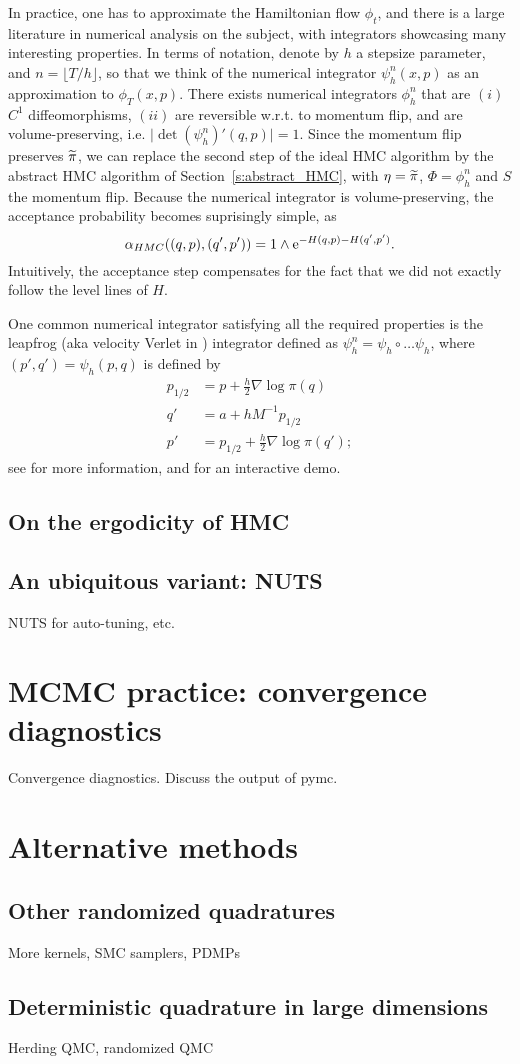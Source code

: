 In practice, one has to approximate the Hamiltonian flow $\phi_t$, and there is a large literature in numerical analysis on the subject, with integrators showcasing many interesting properties.
In terms of notation, denote by $h$ a stepsize parameter, and $n=\lfloor T/h\rfloor$, so that we think of the numerical integrator $\psi_h^n(x,p)$ as an approximation to $\phi_T(x,p)$.
There exists numerical integrators $\phi_h^n$ that are $(i)$ $C^1$ diffeomorphisms, $(ii)$ are reversible w.r.t. to momentum flip, and are volume-preserving, i.e. $\vert \det (\psi_h^n)'(q,p)\vert = 1$.
Since the momentum flip preserves $\widetilde{\pi}$, we can replace the second step of the ideal HMC algorithm by the abstract HMC algorithm of Section~\ref{s:abstract_HMC}, with $\eta=\widetilde{\pi}$, $\Phi=\phi_h^n$ and $S$ the momentum flip. 
Because the numerical integrator is volume-preserving, the acceptance probability becomes suprisingly simple, as 
$$ 
\alpha_{HMC}((q,p),(q',p')) = 1\wedge \mathrm{e}^{-H(q,p)-H(q',p')}.
$$
Intuitively, the acceptance step compensates for the fact that we did not exactly follow the level lines of $H$. 

One common numerical integrator satisfying all the required properties is the leapfrog (aka velocity Verlet in \citep{BoSa18}) integrator defined as $\psi_h^n = \psi_h \circ \dots \psi_h$, where $(p',q') = \psi_h(p,q)$ is defined by
\begin{align*}
    p_{1/2} &= p + \frac{h}{2}\nabla \log \pi(q)\\
    q' &= a+hM^{-1}p_{1/2}\\
    p' &= p_{1/2} + \frac{h}{2} \nabla \log\pi (q');
\end{align*}
see \citep[Section 3]{BoSa18} for more information, and \cfdemo for an interactive demo.

\subsection{On the ergodicity of HMC}

\subsection{An ubiquitous variant: NUTS}
NUTS for auto-tuning, etc.

\section{MCMC practice: convergence diagnostics}
Convergence diagnostics. Discuss the output of pymc.

\section{Alternative methods}
\label{s:alternative_methods}

\subsection{Other randomized quadratures}
More kernels, SMC samplers, PDMPs

\subsection{Deterministic quadrature in large dimensions}
Herding
QMC, randomized QMC

